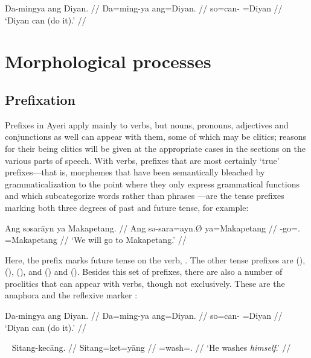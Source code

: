 \ex\begingl
	\gla Da-mingya {ang Diyan}. //
	\glb Da=ming-ya ang=Diyan. //
	\glc so=can-\TsgM{} \Aarg{}=Diyan //
	\glft `Diyan can (do it).' //
\endgl\xe

\section{Morphological processes}

\subsection{Prefixation}

Prefixes in Ayeri apply mainly to verbs, but nouns, pronouns, adjectives and 
conjunctions as well can appear with them, some of which may be clitics; 
reasons for their being clitics will be given at the appropriate cases in the 
sections on the various parts of speech. With verbs, prefixes that are most 
certainly `true' prefixes---that is, morphemes that have been semantically 
bleached by grammaticalization to the point where they only express grammatical 
functions \citep[157ff.]{lehmann2015} and which subcategorize words rather than 
phrases \citep[117]{klavans1985}---are the tense prefixes marking both three 
degrees of past and future tense, for example:

\ex\begingl
	\gla Ang səsarāyn {ya Makapetang}. //
	\glb Ang sə-sara=ayn.Ø ya=Makapetang //
	\glc \AgtT{} \Fut{}-go=\Fpl{}.\Top{} \Loc{}=Makapetang //
	\glft `We will go to Makapetang.' //
\endgl\xe

Here, the prefix  marks future tense on the verb, 
. The other tense prefixes are  
(\NPst{}),  (\Pst{}),  (\RPst{}), and 
 (\NFut{}) and  (\RFut{}). Besides this set of 
prefixes, there are also a number of proclitics that can appear with verbs, 
though not exclusively. These are the anaphora  
and the reflexive marker :
 
\ex\begingl
	\gla Da-mingya {ang Diyan}. //
	\glb Da=ming-ya ang=Diyan. //
	\glc so=can-\TsgM{} \Aarg{}=Diyan //
	\glft `Diyan can (do it).' //
\endgl
% 
\xe

\ex~\begingl
	\gla Sitang-kecāng. //
	\glb Sitang=ket=yāng //
	\glc \Refl{}=wash=\TsgM{}.\Aarg{} //
	\glft `He washes \emph{himself}.' //
\endgl\xe

